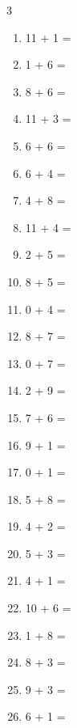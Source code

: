 \documentclass[a4paper, 11pt]{article}
\begin{document}
\begin{multicols}{3}
\begin{enumerate}
      \item 11 + 1 = \dotfill\bigskip
      \item 1 + 6 = \dotfill\bigskip
      \item 8 + 6 = \dotfill\bigskip
      \item 11 + 3 = \dotfill\bigskip
      \item 6 + 6 = \dotfill\bigskip
      \item 6 + 4 = \dotfill\bigskip
      \item 4 + 8 = \dotfill\bigskip
      \item 11 + 4 = \dotfill
      \item 2 + 5 = \dotfill\bigskip
      \item 8 + 5 = \dotfill\bigskip
      \item 0 + 4 = \dotfill\bigskip
      \item 8 + 7 = \dotfill\bigskip
      \item 0 + 7 = \dotfill\bigskip
      \item 2 + 9 = \dotfill\bigskip
      \item 7 + 6 = \dotfill\bigskip
      \item 9 + 1 = \dotfill\bigskip
      \item 0 + 1 = \dotfill\bigskip
      \item 5 + 8 = \dotfill\bigskip
      \item 4 + 2 = \dotfill\bigskip
      \item 5 + 3 = \dotfill\bigskip
      \item 4 + 1 = \dotfill\bigskip
      \item 10 + 6 = \dotfill\bigskip
      \item 1 + 8 = \dotfill\bigskip
      \item 8 + 3 = \dotfill\bigskip
      \item 9 + 3 = \dotfill\bigskip
      \item 6 + 1 = \dotfill
    \end{enumerate}
\end{multicols}
\end{document}
